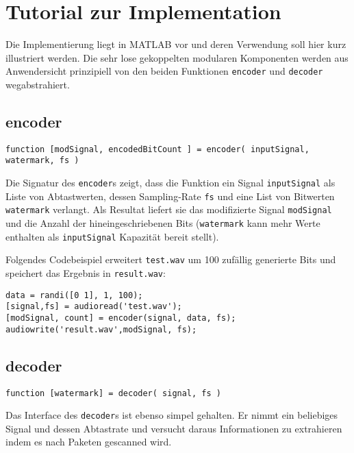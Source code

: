 \chapter{Tutorial zur Implementation}
\label{ch:tutorial}

Die Implementierung liegt in MATLAB vor und deren Verwendung soll hier kurz illustriert werden. Die sehr lose gekoppelten modularen Komponenten werden aus Anwendersicht prinzipiell von den beiden Funktionen \texttt{encoder} und \texttt{decoder} wegabstrahiert. 

\section{encoder}
\label{sec:encoder}

\begin{verbatim}
function [modSignal, encodedBitCount ] = encoder( inputSignal, watermark, fs )
\end{verbatim}

Die Signatur des \texttt{encoder}s zeigt, dass die Funktion ein Signal \texttt{inputSignal} als Liste von Abtastwerten, dessen Sampling-Rate \texttt{fs} und eine List von Bitwerten \texttt{watermark} verlangt. Als Resultat liefert sie das modifizierte Signal \texttt{modSignal} und die Anzahl der hineingeschriebenen Bits (\texttt{watermark} kann mehr Werte enthalten als \texttt{inputSignal} Kapazität bereit stellt).

Folgendes Codebeispiel erweitert \texttt{test.wav} um 100 zufällig generierte Bits und speichert das Ergebnis in \texttt{result.wav}:

\begin{verbatim}
data = randi([0 1], 1, 100);
[signal,fs] = audioread('test.wav');
[modSignal, count] = encoder(signal, data, fs);
audiowrite('result.wav',modSignal, fs);
\end{verbatim}

\newpage


\section{decoder}

\begin{verbatim}
function [watermark] = decoder( signal, fs )
\end{verbatim}

Das Interface des \texttt{decoder}s ist ebenso simpel gehalten. Er nimmt ein beliebiges Signal und dessen Abtastrate und versucht daraus Informationen zu extrahieren indem es nach Paketen gescanned wird. 

